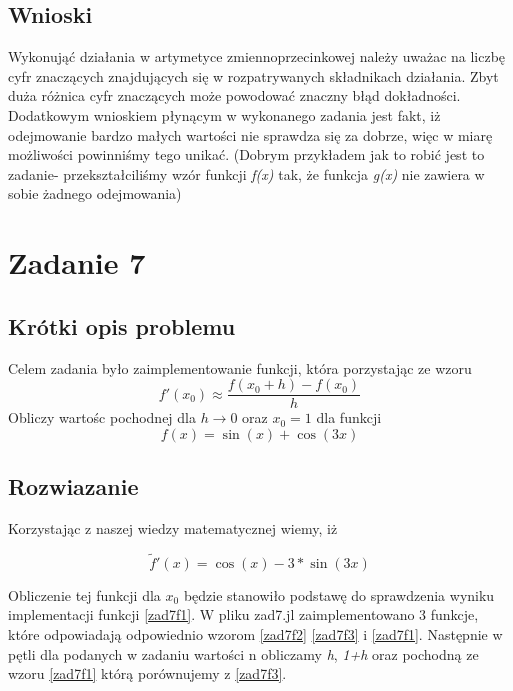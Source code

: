 \documentclass[a4paper,14pt]{report}
\begin{document}
\section{Wnioski}
Wykonująć działania w artymetyce zmiennoprzecinkowej należy uważac na liczbę cyfr znaczących znajdujących się w rozpatrywanych składnikach działania. Zbyt duża różnica cyfr znaczących może powodować znaczny błąd dokładności. Dodatkowym wnioskiem płynącym w wykonanego zadania jest fakt, iż odejmowanie bardzo małych wartości nie sprawdza się za dobrze, więc w miarę możliwości powinniśmy tego unikać. (Dobrym przykładem jak to robić jest to zadanie- przekształciliśmy wzór funkcji \textit{f(x)} tak, że funkcja \textit{g(x)} nie zawiera w sobie żadnego odejmowania)






\chapter{Zadanie 7}
\section{Krótki opis problemu}
Celem zadania było zaimplementowanie funkcji, która porzystając ze wzoru
\begin{equation}
  f'(x_{0})\approx \frac{f(x_{0}+h)-f(x_{0})}{h}
  \label{zad7f1}
\end{equation}
Obliczy wartośc pochodnej dla $ h \rightarrow 0 $ oraz $x_{0} = 1 $ dla funkcji 
\begin{equation}
  f(x)= \sin(x) + \cos(3x)
  \label{zad7f2}
\end{equation}
\section{Rozwiazanie}

Korzystając z naszej wiedzy matematycznej wiemy, iż

\begin{equation}
  \widetilde{f}'(x)= \cos(x) - 3* \sin(3x)
  \label{zad7f3}
\end{equation}


Obliczenie tej funkcji dla $x_{0}$ będzie stanowiło podstawę do sprawdzenia wyniku implementacji funkcji \ref{zad7f1}.
W pliku zad7.jl zaimplementowano 3 funkcje, które odpowiadają odpowiednio wzorom \ref{zad7f2} \ref{zad7f3} i \ref{zad7f1}.
Następnie w pętli dla podanych w zadaniu wartości n obliczamy \textit{h}, \textit{1+h} oraz pochodną ze wzoru \ref{zad7f1} którą porównujemy z \ref{zad7f3}.
\end{document}
